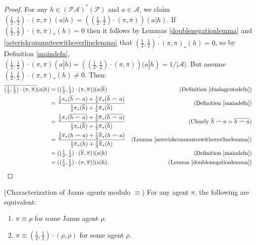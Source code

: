 \documentclass[runningheads]{llncs}
\begin{document}
\begin{proof}
    For any $h\in(\mathcal P\mathcal A)^*(\mathcal P)$ and $a\in\mathcal A$,
    we claim
    $\overline{(\frac12,\frac12)\cdot(\pi,\overline{\pi})}(a|h)
    =((\frac12,\frac12)\cdot(\pi,\overline{\pi}))(a|h)$.
    If $(\frac12,\frac12)\cdot(\pi,\overline\pi)_*(h)=0$
    then it follows by Lemmas \ref{doublenegationlemma} and
    \ref{asteriskcommuteswithoverlinelemma} that
    $\overline{(\frac12,\frac12)\cdot(\pi,\overline\pi)}_*(h)=0$,
    so by Definition \ref{maindefn},
    $\overline{(\frac12,\frac12)\cdot(\pi,\overline{\pi})}(a|h)
    =((\frac12,\frac12)\cdot(\pi,\overline{\pi}))(a|h)=1/|\mathcal A|$.
    But assume $(\frac12,\frac12)\cdot(\pi,\overline\pi)_*(h)\not=0$.
    Then:
    \begin{align*}
        \overline{(\mbox{$\frac12$},\mbox{$\frac12$})\cdot(\pi,\overline{\pi})}(a|h)
        &= ((\mbox{$\frac12$},\mbox{$\frac12$})\cdot(\pi,\overline{\pi}))(a|\overline h)
            &\mbox{(Definition \ref{dualagentsdefn})}\\
        &= \frac
            {\frac12\pi_*(\overline h\frown a)+\frac12\overline\pi_*(\overline h\frown a)}
            {\frac12\pi_*(\overline h)+\frac12\overline\pi_*(\overline h)}
            &\mbox{(Definition \ref{maindefn})}\\
        &= \frac
            {\frac12\pi_*(\overline{h\frown a})+\frac12\overline\pi_*(\overline{h\frown a})}
            {\frac12\pi_*(\overline h)+\frac12\overline\pi_*(\overline h)}
            &\mbox{(Clearly $\overline h\frown a=\overline{h\frown a}$)}\\
        &= \frac
            {\frac12\overline\pi_*(h\frown a)+\frac12\overline{\overline\pi}_*(h\frown a)}
            {\frac12\overline\pi_*(h)+\frac12\overline{\overline\pi}_*(h)}
            &\mbox{(Lemma \ref{asteriskcommuteswithoverlinelemma})}\\
        &= ((\mbox{$\frac12$},\mbox{$\frac12$})
            \cdot(\overline{\overline\pi},\overline\pi))(a|h)
            &\mbox{(Definition \ref{maindefn})}\\
        &= ((\mbox{$\frac12$},\mbox{$\frac12$})\cdot(\pi,\overline\pi))(a|h).
            &\mbox{(Lemma \ref{doublenegationlemma})}
    \end{align*}
\end{proof}

\begin{proposition}
    (Characterization of Janus agents modulo $\equiv$)
    For any agent $\pi$, the following are equivalent:
    \begin{enumerate}
        \item $\pi\equiv\rho$ for some Janus agent $\rho$.
        \item $\pi\equiv(\frac12,\frac12)\cdot(\rho,\overline{\rho})$
            for some agent $\rho$.
    \end{enumerate}
\end{proposition}
\end{document}
